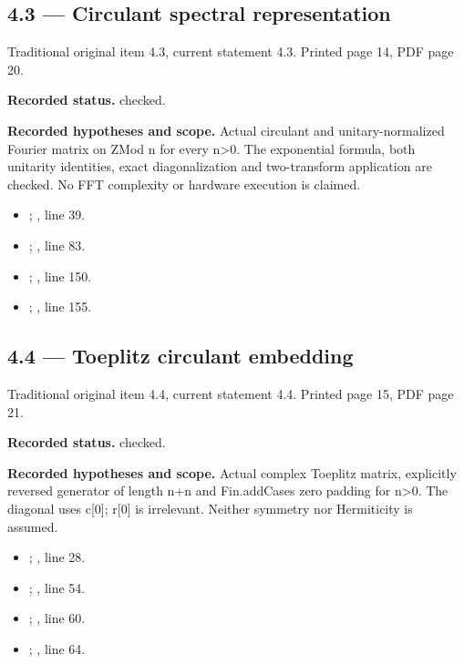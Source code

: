 \subsection{4.3 — Circulant spectral representation}
\label{result:4.3}
{\footnotesize\color{muted}Traditional original item 4.3, current statement 4.3. Printed page 14, PDF page 20.}\par
\textbf{Recorded status.} checked.

\textbf{Recorded hypotheses and scope.} Actual circulant and unitary-normalized Fourier matrix on ZMod n for every n>0. The exponential formula, both unitarity identities, exact diagonalization and two-transform application are checked. No FFT complexity or hardware execution is claimed.

\begin{itemize}
\item {}; , line 39.
\item {}; , line 83.
\item {}; , line 150.
\item {}; , line 155.
\end{itemize}
\subsection{4.4 — Toeplitz circulant embedding}
\label{result:4.4}
{\footnotesize\color{muted}Traditional original item 4.4, current statement 4.4. Printed page 15, PDF page 21.}\par
\textbf{Recorded status.} checked.

\textbf{Recorded hypotheses and scope.} Actual complex Toeplitz matrix, explicitly reversed generator of length n+n and Fin.addCases zero padding for n>0. The diagonal uses c[0]; r[0] is irrelevant. Neither symmetry nor Hermiticity is assumed.

\begin{itemize}
\item {}; , line 28.
\item {}; , line 54.
\item {}; , line 60.
\item {}; , line 64.
\end{itemize}
